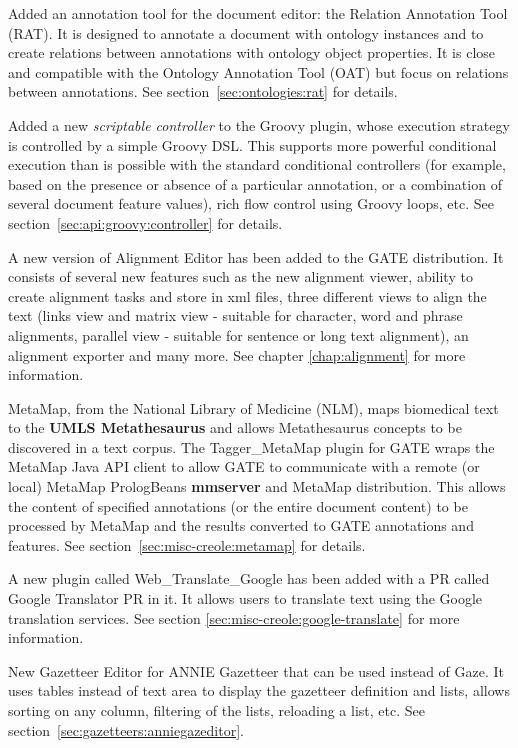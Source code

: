
Added an annotation tool for the document editor: the Relation Annotation
Tool (RAT). It is designed to annotate a document with ontology instances
and to create relations between annotations with ontology object
properties. It is close and compatible with the Ontology Annotation Tool
(OAT) but focus on relations between annotations. See
section~\ref{sec:ontologies:rat} for details.

Added a new \emph{scriptable controller} to the Groovy plugin, whose execution
strategy is controlled by a simple Groovy DSL.  This supports more powerful
conditional execution than is possible with the standard conditional
controllers (for example, based on the presence or absence of a particular
annotation, or a combination of several document feature values), rich flow
control using Groovy loops, etc.  See
section~\ref{sec:api:groovy:controller} for details.

A new version of Alignment Editor has been added to the GATE distribution. It 
consists of several new features such as the new alignment viewer, ability to
create alignment tasks and store in xml files, three different views to align
the text (links view and matrix view - suitable for character, word and phrase
alignments, parallel view - suitable for sentence or long text alignment), an
alignment exporter and many more.  See chapter \ref{chap:alignment} for more 
information.

MetaMap, from the National Library of Medicine (NLM), maps biomedical text to 
the \textbf{UMLS Metathesaurus} and allows Metathesaurus concepts to be 
discovered in a text corpus. The Tagger\_MetaMap plugin for GATE wraps the 
MetaMap Java API client to allow GATE to communicate with a remote (or local) 
MetaMap PrologBeans \textbf{mmserver} and MetaMap distribution. This allows the 
content of specified annotations (or the entire document content) to be 
processed by MetaMap and the results converted to GATE annotations and features.
See section~\ref{sec:misc-creole:metamap} for details.

A new plugin called Web\_Translate\_Google has been added with a PR called 
Google Translator PR in it.  It allows users to translate text using the
Google translation services.  See section \ref{sec:misc-creole:google-translate}
for more information.

New Gazetteer Editor for ANNIE Gazetteer that can be used instead of
Gaze. It uses tables instead of text area to display the gazetteer
definition and lists, allows sorting on any column, filtering of the lists,
reloading a list, etc. See section~\ref{sec:gazetteers:anniegazeditor}.

